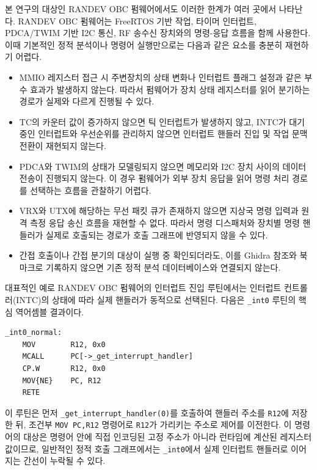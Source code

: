 \documentclass[master,korean,final]{kaist-ucs}
\begin{document}
본 연구의 대상인 RANDEV OBC 펌웨어에서도 이러한 한계가 여러 곳에서 나타난다. RANDEV OBC 펌웨어는 FreeRTOS 기반 작업, 타이머 인터럽트, PDCA/TWIM 기반 I2C 통신, RF 송수신 장치와의 명령-응답 흐름을 함께 사용한다. 이때 기본적인 정적 분석이나 명령어 실행만으로는 다음과 같은 요소를 충분히 재현하기 어렵다.

\begin{itemize}
    \item MMIO 레지스터 접근 시 주변장치의 상태 변화나 인터럽트 플래그 설정과 같은 부수 효과가 발생하지 않는다. 따라서 펌웨어가 장치 상태 레지스터를 읽어 분기하는 경로가 실제와 다르게 진행될 수 있다.
    \item TC의 카운터 값이 증가하지 않으면 틱 인터럽트가 발생하지 않고, INTC가 대기 중인 인터럽트와 우선순위를 관리하지 않으면 인터럽트 핸들러 진입 및 작업 문맥 전환이 재현되지 않는다.
    \item PDCA와 TWIM의 상태가 모델링되지 않으면 메모리와 I2C 장치 사이의 데이터 전송이 진행되지 않는다. 이 경우 펌웨어가 외부 장치 응답을 읽어 명령 처리 경로를 선택하는 흐름을 관찰하기 어렵다.
    \item VRX와 UTX에 해당하는 무선 패킷 큐가 존재하지 않으면 지상국 명령 입력과 원격 측정 응답 송신 흐름을 재현할 수 없다. 따라서 명령 디스패처와 장치별 명령 핸들러가 실제로 호출되는 경로가 호출 그래프에 반영되지 않을 수 있다.
    \item 간접 호출이나 간접 분기의 대상이 실행 중 확인되더라도, 이를 Ghidra 참조와 북마크로 기록하지 않으면 기존 정적 분석 데이터베이스와 연결되지 않는다.
\end{itemize}

대표적인 예로 RANDEV OBC 펌웨어의 인터럽트 진입 루틴에서는 인터럽트 컨트롤러(INTC)의 상태에 따라 실제 핸들러가 동적으로 선택된다. 다음은 \texttt{\_int0} 루틴의 핵심 역어셈블 결과이다.

\begin{verbatim}
_int0_normal:
    MOV        R12, 0x0
    MCALL      PC[->_get_interrupt_handler]
    CP.W       R12, 0x0
    MOV{NE}    PC, R12
    RETE
\end{verbatim}

이 루틴은 먼저 \texttt{\_get\_interrupt\_handler(0)}를 호출하여 핸들러 주소를 \texttt{R12}에 저장한 뒤, 조건부 \texttt{MOV PC,R12} 명령어로 \texttt{R12}가 가리키는 주소로 제어를 이전한다. 이 명령어의 대상은 명령어 안에 직접 인코딩된 고정 주소가 아니라 런타임에 계산된 레지스터 값이므로, 일반적인 정적 호출 그래프에서는 \texttt{\_int0}에서 실제 인터럽트 핸들러로 이어지는 간선이 누락될 수 있다.
\end{document}
